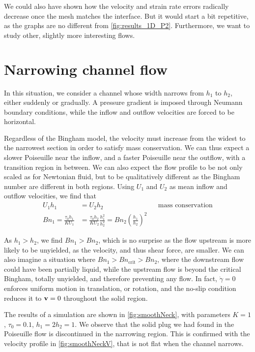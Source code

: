 \documentclass[11 pt]{report}
\begin{document}
We could also have shown how the velocity and strain rate errors radically decrease once the mesh matches the interface. But it would start a bit repetitive, as the graphs are no different from \cref{fig:results_1D_P2}. Furthermore, we want to study other, slightly more interesting flows.

\section{Narrowing channel flow}
In this situation, we consider a channel whose width narrows from $h_1$ to $h_2$, either suddenly or gradually. A pressure gradient is imposed through Neumann boundary conditions, while the inflow and outflow velocities are forced to be horizontal.

Regardless of the Bingham model, the velocity must increase from the widest to the narrowest section in order to satisfy mass conservation. We can thus expect a slower Poiseuille near the inflow, and a faster Poiseuille near the outflow, with a transition region in between. We can also expect the flow profile to be not only scaled as for Newtonian fluid, but to be qualitatively different as the Bingham number are different in both regions. Using $U_1$ and $U_2$ as mean inflow and outflow velocities, we find that
\begin{equation}
    \begin{aligned}
        U_1 h_1 &= U_2 h_2 &&\text{mass conservation}\\
        Bn_{1} = \frac{\tau_0 h_1}{K U_1} &= \frac{\tau_0 h_2}{K U_2} \frac{h_1^2}{h_2^2} = Bn_{2} \left(\frac{h_1}{h_2}\right)^2
    \end{aligned}
\end{equation}

As $h_1>h_2$, we find $Bn_1>Bn_2$, which is no surprise as the flow upstream is more likely to be unyielded, as the velocity, and thus shear force, are smaller. We can also imagine a situation where $Bn_1>Bn_{\text{crit}}>Bn_2$, where the downstream flow could have been partially liquid, while the upstream flow is beyond the critical Bingham, totally unyielded, and therefore preventing any flow. In fact, $\dot\gamma=0$ enforces uniform motion in translation, or rotation, and the no-slip condition reduces it to $\mathbf{v}=0$ throughout the solid region.

The results of a simulation are shown in \cref{fig:smoothNeck}, with parameters $K=1$, $\tau_0=0.1$, $h_1=2h_2=1$. We observe that the solid plug we had found in the Poiseuille flow is discontinued in the narrowing region. This is confirmed with the velocity profile in \cref{fig:smoothNeckV}, that is not flat when the channel narrows. 
\end{document}
